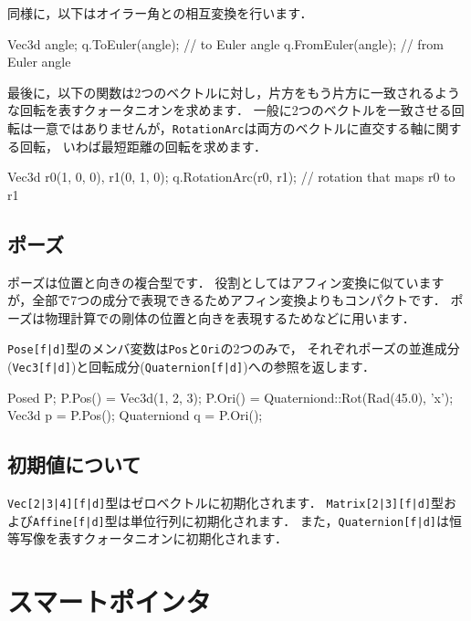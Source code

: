 \KLUDGE 同様に，以下はオイラー角との相互変換を行います．
\begin{sourcecode}
Vec3d angle;
q.ToEuler(angle);      // to Euler angle
q.FromEuler(angle);    // from Euler angle
\end{sourcecode}

\KLUDGE 最後に，以下の関数は2\KLUDGE つのベクトルに対し，片方をもう片方に一致されるような回転を表すクォータニオンを求めます．
\KLUDGE 一般に2\KLUDGE つのベクトルを一致させる回転は一意ではありませんが，\texttt{RotationArc}\KLUDGE は両方のベクトルに直交する軸に関する回転，
\KLUDGE いわば最短距離の回転を求めます．
\begin{sourcecode}
Vec3d r0(1, 0, 0), r1(0, 1, 0);
q.RotationArc(r0, r1);    // rotation that maps r0 to r1 
\end{sourcecode}

\subsection*{\KLUDGE ポーズ}


\KLUDGE ポーズは位置と向きの複合型です．
\KLUDGE 役割としてはアフィン変換に似ていますが，全部で7\KLUDGE つの成分で表現できるためアフィン変換よりもコンパクトです．
\KLUDGE ポーズは物理計算での剛体の位置と向きを表現するためなどに用います．

\texttt{Pose[f|d]}\KLUDGE 型のメンバ変数は\texttt{Pos}\KLUDGE と\texttt{Ori}\KLUDGE の2\KLUDGE つのみで，
\KLUDGE それぞれポーズの並進成分(\texttt{Vec3[f|d]})\KLUDGE と回転成分(\texttt{Quaternion[f|d]})\KLUDGE への参照を返します．
\begin{sourcecode}
Posed P;
P.Pos() = Vec3d(1, 2, 3);
P.Ori() = Quaterniond::Rot(Rad(45.0), 'x');
Vec3d p = P.Pos();
Quaterniond q = P.Ori();
\end{sourcecode}

\subsection*{\KLUDGE 初期値について}

\texttt{Vec[2|3|4][f|d]}\KLUDGE 型はゼロベクトルに初期化されます．
\texttt{Matrix[2|3][f|d]}\KLUDGE 型および\texttt{Affine[f|d]}\KLUDGE 型は単位行列に初期化されます．
\KLUDGE また，\texttt{Quaternion[f|d]}\KLUDGE は恒等写像を表すクォータニオンに初期化されます．

\section{\KLUDGE スマートポインタ}

